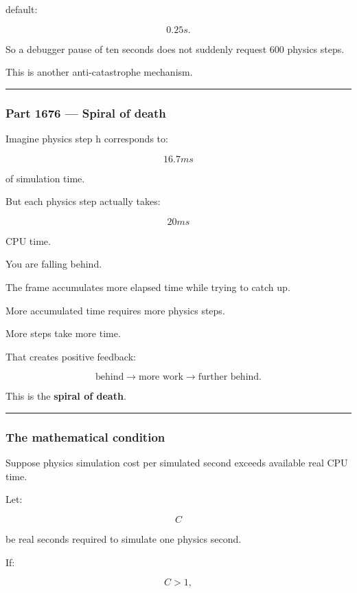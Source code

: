 default:

\[
0.25s.
\]

So a debugger pause of ten seconds does not suddenly request 600 physics steps.

This is another anti-catastrophe mechanism.

\begin{center}\rule{0.5\linewidth}{0.5pt}\end{center}

\subsubsection{Part 1676 --- Spiral of death}\label{part-1676-spiral-of-death}

Imagine physics step h corresponds to:

\[
16.7ms
\]

of simulation time.

But each physics step actually takes:

\[
20ms
\]

CPU time.

You are falling behind.

The frame accumulates more elapsed time while trying to catch up.

More accumulated time requires more physics steps.

More steps take more time.

That creates positive feedback:

\[
\boxed{
\text{behind}
\rightarrow
\text{more work}
\rightarrow
\text{further behind}.
}
\]

This is the \textbf{spiral of death}.

\begin{center}\rule{0.5\linewidth}{0.5pt}\end{center}

\subsubsection{The mathematical condition}\label{the-mathematical-condition}

Suppose physics simulation cost per simulated second exceeds available real CPU time.

Let:

\[
C
\]

be real seconds required to simulate one physics second.

If:

\[
C>1,
\]

